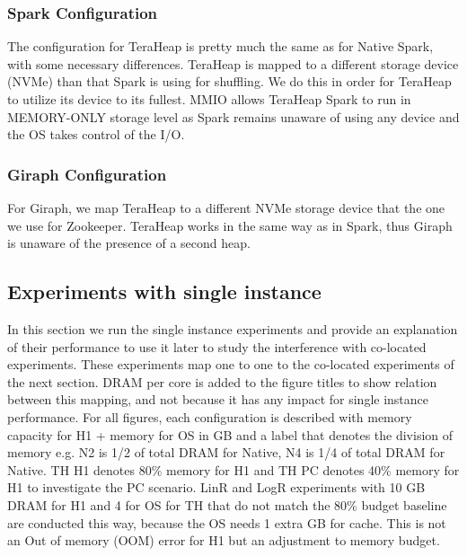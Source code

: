 \subsubsection{Spark Configuration}
The configuration for TeraHeap is pretty much the same as for Native
Spark, with some necessary differences. TeraHeap
is mapped to a different storage device (NVMe) than that Spark is
using for shuffling. We do this in order for TeraHeap to utilize its
device to its fullest. MMIO allows TeraHeap Spark to run in
MEMORY-ONLY storage level as Spark remains unaware of using any device and
the OS takes control of the I/O.

\subsubsection{Giraph Configuration}
For Giraph, we map TeraHeap to a different NVMe storage device that the one we
use for Zookeeper. TeraHeap works in the same way as in Spark,
thus Giraph is unaware of the presence of a second heap.

\subsection{Experiments with single instance}

In this section we run the single instance experiments and provide an explanation of their performance to use it later to study the interference with co-located experiments.
These experiments map one to one to the co-located experiments of the next section.
DRAM per core is added to the figure titles to show relation between this mapping, and not because it has any impact
for single instance performance. For all figures, each configuration is described with memory capacity for H1 + memory for OS in GB and a label that denotes the division of memory e.g. N2 is 1/2 of total DRAM for Native, N4 is 1/4 of total DRAM for Native. TH H1 denotes 80\% memory for H1 and TH PC denotes 40\% memory for H1 to investigate the PC scenario. LinR and LogR experiments with 10 GB DRAM for H1 and 4 for OS for TH that do not match the 80\% budget baseline are conducted this way, because the OS needs 1 extra GB for cache. This is not an Out of memory (OOM) error for H1 but an adjustment to memory budget.

